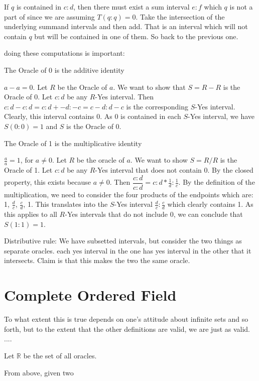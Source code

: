 \documentclass[12pt]{article}
\theoremstyle{remark}
\begin{document}
If $q$ is contained in $c:d$, then there must exist a sum interval $e:f$ which $q$ is not a part of since we are assuming $T(q:q)=0$. Take the intersection of the underlying summand intervals and then add. That is an interval which will not contain $q$ but will be contained in one of them. So back to the previous one. 



doing these computations is important:

The Oracle of 0 is the additive identity

$a-a = 0$. Let $R$ be the Oracle of $a$. We want to show that $S= R-R$ is the Oracle of 0. Let $c:d$ be any $R$-Yes interval. Then $c:d-c:d = c:d+ -d:-c = c-d:d-c$ is the corresponding $S$-Yes interval. Clearly, this interval contains 0. As 0 is contained in each $S$-Yes interval, we have $S(0:0)=1$ and $S$ is the Oracle of 0. 

The Oracle of 1 is the multiplicative identity

$\tfrac{a}{a} = 1$, for $a \neq 0$. Let $R$ be the oracle of $a$. We want to show $S=R/R$ is the Oracle of 1. Let $c:d$ be any $R$-Yes interval that does not contain 0. By the closed property, this exists because $a \neq 0$. Then $\dfrac{c:d}{c:d} = c:d * \tfrac{1}{d}:\tfrac{1}{c}$. By the definition of the multiplication, we need to consider the four products of the endpoints which are: 1, $\tfrac{d}{c}$, $\tfrac{c}{d}$, 1. This translates into the $S$-Yes interval $\tfrac{d}{c}:\tfrac{c}{d}$ which clearly contains 1. As this applies to all $R$-Yes intervals that do not include 0, we can conclude that $S(1:1) =1$.



Distributive rule:  We have subsetted intervals, but consider the two things as separate oracles. each yes interval in the one has yes interval in the other that it intersects. Claim is that this makes the two the same oracle. 


\section{Complete Ordered Field}

To what extent this is true depends on one's attitude about infinite sets and so forth, but to the extent that the other definitions are valid, we are just as valid. ....

Let $\mathbb{R}$ be the set of all oracles. 

From above, given two 
\end{document}

